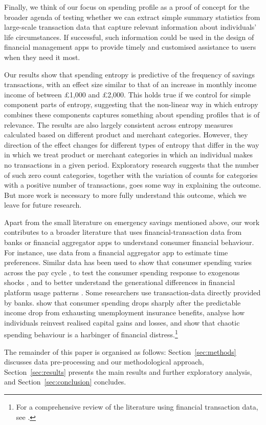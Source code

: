 Finally, we think of our focus on spending profile as a proof of concept for
the broader agenda of testing whether we can extract simple summary statistics
from large-scale transaction data that capture relevant information about
individuals' life circumstances. If successful, such information could be used
in the design of financial management apps to provide timely and customised
assistance to users when they need it most.

Our results show that spending entropy is predictive of the frequency of
savings transactions, with an effect size similar to that of an increase in
monthly income income of between \pounds1,000 and \pounds2,000. This holds true
if we control for simple component parts of entropy, suggesting that the
non-linear way in which entropy combines these components captures something
about spending profiles that is of relevance. The results are also largely
consistent across entropy measures calculated based on different product and
merchant categories. However, they direction of the effect changes for
different types of entropy that differ in the way in which we treat product or
merchant categories in which an individual makes no transactions in a given
period. Exploratory research suggests that the number of such zero count
categories, together with the variation of counts for categories with a
positive number of transactions, goes some way in explaining the outcome. But
more work is necessary to more fully understand this outcome, which we leave
for future research.

Apart from the small literature on emergency savings mentioned above, our work
contributes to a broader literature that uses financial-transaction data
from banks or financial aggregator apps to understand consumer financial
behaviour. For instance, \citet{kuchler2020sticking} use data from a
financial aggregator app to estimate time preferences. Similar data has been
used to show that consumer spending varies across the pay cycle
\citep{gelman2014harnessing,olafsson2018liquid}, to test the consumer spending
response to exogenous shocks \citep{baker2018debt,baugh2014disentangling}, and
to better understand the generational differences in financial platform usage
patterns \citep{carlin2019generational}. Some researchers use transaction-data
directly provided by banks. \citet{ganong2019consumer} show that consumer
spending drops sharply after the predictable income drop from exhausting
unemployment insurance benefits, \citet{meyer2018fully} analyse how individuals
reinvest realised capital gains and losses, and \citet{muggleton2020evidence}
show that chaotic spending behaviour is a harbinger of financial
distress.\footnote{For a comprehensive review of the literature using financial
transaction data, see \citet{baker2022household}.}

The remainder of this paper is organised as follows: Section~\ref{sec:methods}
discusses data pre-processing and our methodological approach,
Section~\ref{sec:results} presents the main results and further exploratory
analysis, and Section~\ref{sec:conclusion} concludes.

